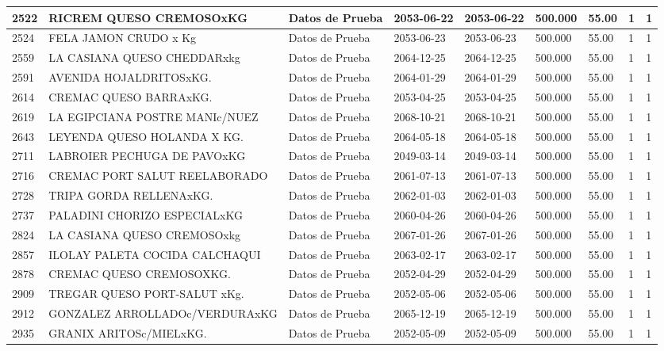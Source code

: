 \documentclass[a4paper,12pt]{article}
\begin{document}
\begin{landscape}
\begin{longtable}{|p{4cm}|p{2.5cm}|p{2.5cm}|p{1.8cm}|p{1.8cm}|p{1cm}|p{1cm}|p{3cm}|p{3cm}||}
2522 & RICREM QUESO CREMOSOxKG & Datos de Prueba & 2053-06-22 & 2053-06-22 & 500.000 & 55.00 & 1 & 1 \\ \hline 
2524 & FELA JAMON CRUDO x Kg & Datos de Prueba & 2053-06-23 & 2053-06-23 & 500.000 & 55.00 & 1 & 1 \\ \hline 
2559 & LA CASIANA QUESO CHEDDARxkg & Datos de Prueba & 2064-12-25 & 2064-12-25 & 500.000 & 55.00 & 1 & 1 \\ \hline 
2591 & AVENIDA HOJALDRITOSxKG. & Datos de Prueba & 2064-01-29 & 2064-01-29 & 500.000 & 55.00 & 1 & 1 \\ \hline 
2614 & CREMAC QUESO BARRAxKG. & Datos de Prueba & 2053-04-25 & 2053-04-25 & 500.000 & 55.00 & 1 & 1 \\ \hline 
2619 & LA EGIPCIANA POSTRE MANIc/NUEZ & Datos de Prueba & 2068-10-21 & 2068-10-21 & 500.000 & 55.00 & 1 & 1 \\ \hline 
2643 & LEYENDA QUESO HOLANDA X KG. & Datos de Prueba & 2064-05-18 & 2064-05-18 & 500.000 & 55.00 & 1 & 1 \\ \hline 
2711 & LABROIER PECHUGA DE PAVOxKG & Datos de Prueba & 2049-03-14 & 2049-03-14 & 500.000 & 55.00 & 1 & 1 \\ \hline 
2716 & CREMAC PORT SALUT REELABORADO & Datos de Prueba & 2061-07-13 & 2061-07-13 & 500.000 & 55.00 & 1 & 1 \\ \hline 
2728 & TRIPA GORDA RELLENAxKG. & Datos de Prueba & 2062-01-03 & 2062-01-03 & 500.000 & 55.00 & 1 & 1 \\ \hline 
2737 & PALADINI CHORIZO ESPECIALxKG & Datos de Prueba & 2060-04-26 & 2060-04-26 & 500.000 & 55.00 & 1 & 1 \\ \hline 
2824 & LA CASIANA QUESO CREMOSOxkg & Datos de Prueba & 2067-01-26 & 2067-01-26 & 500.000 & 55.00 & 1 & 1 \\ \hline 
2857 & ILOLAY PALETA COCIDA CALCHAQUI & Datos de Prueba & 2063-02-17 & 2063-02-17 & 500.000 & 55.00 & 1 & 1 \\ \hline 
2878 & CREMAC QUESO CREMOSOXKG. & Datos de Prueba & 2052-04-29 & 2052-04-29 & 500.000 & 55.00 & 1 & 1 \\ \hline 
2909 & TREGAR QUESO PORT-SALUT xKg. & Datos de Prueba & 2052-05-06 & 2052-05-06 & 500.000 & 55.00 & 1 & 1 \\ \hline 
2912 & GONZALEZ ARROLLADOc/VERDURAxKG & Datos de Prueba & 2065-12-19 & 2065-12-19 & 500.000 & 55.00 & 1 & 1 \\ \hline 
2935 & GRANIX ARITOSc/MIELxKG. & Datos de Prueba & 2052-05-09 & 2052-05-09 & 500.000 & 55.00 & 1 & 1 \\ \hline 

\end{longtable}
\end{landscape}
\end{document}
